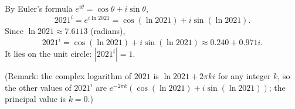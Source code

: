 By Euler's formula $e^{i\theta}=\cos\theta+i\sin\theta$,
\[2021^{i}=e^{i\ln2021}=\cos\left(\ln2021\right)+i\sin\left(\ln2021\right).\]
Since $\ln2021\approx7.6113$ (radians),
\[\boxed{2021^{i}=\cos(\ln2021)+i\sin(\ln2021)\approx0.240+0.971i}.\]
It lies on the unit circle: $\left|2021^{i}\right|=1$.

(Remark: the complex logarithm of $2021$ is $\ln2021+2\pi ki$ for any integer $k$, so the other values of $2021^{i}$ are $e^{-2\pi k}\left(\cos(\ln2021)+i\sin(\ln2021)\right)$; the principal value is $k=0$.)
